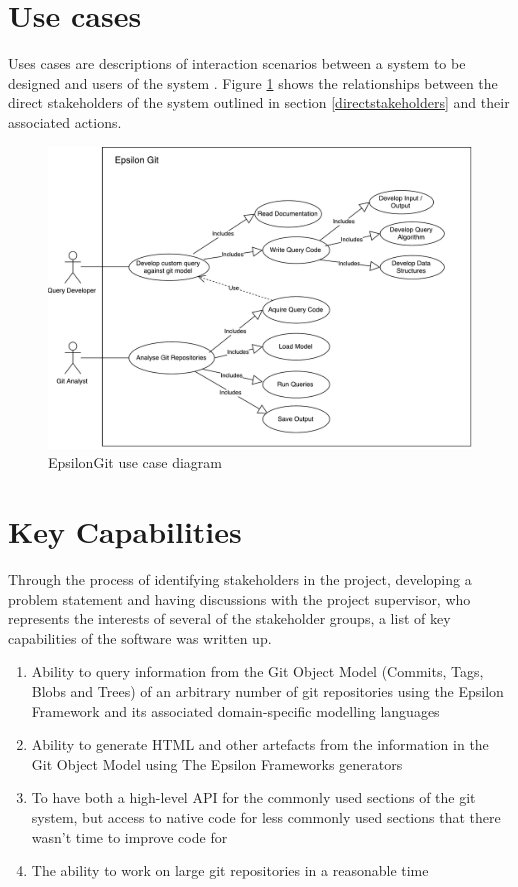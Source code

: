 \documentclass[11pt]{book}
\begin{document}
\section{Use cases}
Uses cases are descriptions of interaction scenarios between a system to be designed and users of the system \cite{usecase}. Figure \ref{fig:usecasediagram} shows the relationships between the direct stakeholders of the system outlined in section \ref{directstakeholders} and their associated actions.

\begin{figure}[h]
	\centering
	\includegraphics[width=\textwidth]{images/use-case-diagram}
	\caption{EpsilonGit use case diagram}
	\label{fig:usecasediagram}
\end{figure}

\section{Key Capabilities}
Through the process of identifying stakeholders in the project, developing a problem statement and having discussions with the project supervisor, who represents the interests of several of the stakeholder groups, a list of key capabilities of the software was written up.

\begin{enumerate}
	\item Ability to query information from the Git Object Model (Commits, Tags, Blobs and Trees) of an arbitrary number of git repositories using the Epsilon Framework and its associated domain-specific modelling languages
	\item Ability to generate HTML and other artefacts from the information in the Git Object Model using The Epsilon Frameworks generators
	\item To have both a high-level API for the commonly used sections of the git system, but access to native code for less commonly used sections that there wasn't time to improve code for
	\item The ability to work on large git repositories in a reasonable time
\end{enumerate} 
\end{document}
